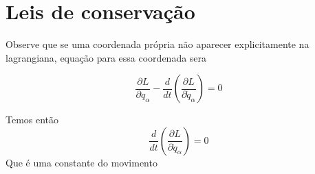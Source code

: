 \documentclass[11pt]{article}
\begin{document}
\section{Leis de conservação}
\label{sec:org8fb6461}
Observe que se uma coordenada própria não aparecer explicitamente na
lagrangiana, equação para essa coordenada sera

  \begin{equation}
\frac{\partial L}{\partial q_{\alpha}} - \frac{d}{dt}\left(\frac{\partial L}{\partial \dot{q}_{\alpha}} \right) = 0
  \end{equation}

Temos então
 \begin{equation}
\frac{d}{dt}\left(\frac{\partial L}{\partial \dot{q}_{\alpha}}\right) = 0
 \end{equation}
Que é uma constante do movimento
\end{document}
